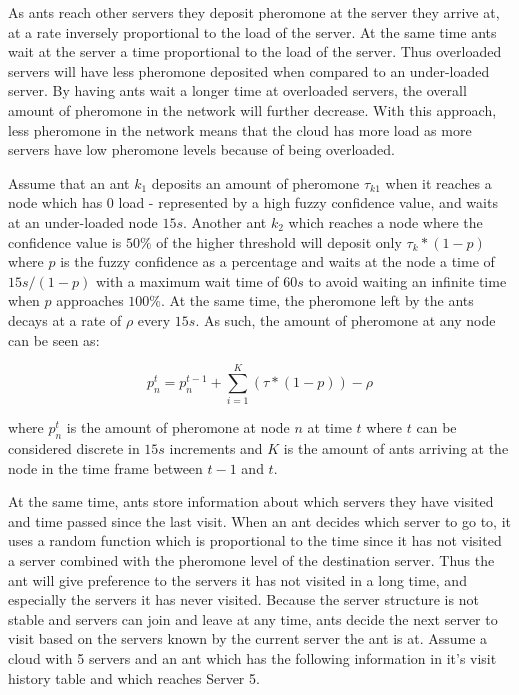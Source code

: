 As ants reach other servers they deposit pheromone at the server they arrive at, at a rate inversely proportional to the load of the server. At the same time ants wait at the server a time proportional to the load of the server. Thus overloaded servers will have less pheromone deposited when compared to an under-loaded server. By having ants wait a longer time at overloaded servers, the overall amount of pheromone in the network will further decrease. With this approach, less pheromone in the network means that the cloud has more load as more servers have low pheromone levels because of being overloaded.

Assume that an ant $k_{1}$ deposits an amount of pheromone $\tau_{k1}$ when it reaches a node which has 0 load - represented by a high fuzzy confidence value, and waits at an under-loaded node $15s$. Another ant $k_{2}$ which reaches a node where the confidence value is $50\%$ of the higher threshold will deposit only $\tau_{k} * (1 - p)$ where $p$ is the fuzzy confidence as a percentage and waits at the node a time of $15s/(1-p)$ with a maximum wait time of $60s$ to avoid waiting an infinite time when $p$ approaches $100\%$. At the same time, the pheromone left by the ants decays at a rate of $\rho$ every $15s$. As such, the amount of pheromone at any node can be seen as:

\begin{equation}
p^{t}_{n} = p^{t-1}_{n} + \sum_{i=1}^{K}(\tau * (1 - p)) - \rho
\end{equation}

where $p^{t}_{n}$ is the amount of pheromone at node $n$ at time $t$ where $t$ can be considered discrete in $15s$ increments and $K$ is the amount of ants arriving at the node in the time frame between $t-1$ and $t$.

At the same time, ants store information about which servers they have visited and time passed since the last visit. When an ant decides which server to go to, it uses a random function which is proportional to the time since it has not visited a server combined with the pheromone level of the destination server. Thus the ant will give preference to the servers it has not visited in a long time, and especially the servers it has never visited. Because the server structure is not stable and servers can join and leave at any time, ants decide the next server to visit based on the servers known by the current server the ant is at.  Assume a cloud with 5 servers and an ant which has the following information in it's visit history table and which reaches Server 5.

